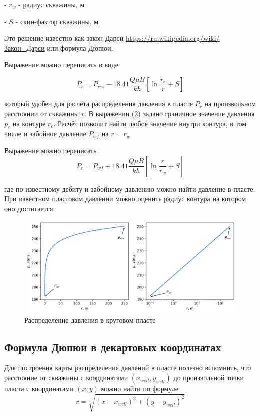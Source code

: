 \documentclass[oneside, openany]{memoir}
\begin{document}
	- $r_w$ - радиус скважины, м
	
	- $S$ - скин-фактор скважины, м
	
	Это решение известно как закон Дарси \url{https://ru.wikipedia.org/wiki/Закон_Дарси} или формула Дюпюи.
	
	Выражение можно переписать в виде
	
	\begin{equation}
		P_{r} = P_{res} - 18.41\dfrac{ Q\mu B }{kh} \left[ \ln\dfrac{r_e}{r} +S \right]
	\end{equation}
	
	который удобен для расчёта распределения давления в пласте $P_r$ на произвольном расстоянии от скважины $r$.
	В выражении (2) задано граничное значение давления $p_e$ на контуре $r_e$. Расчёт позволит найти любое значение внутри контура, в том числе и забойное давление $P_{wf}$ на $r=r_w$
	
	Выражение можно переписать 
	\begin{equation}
	P_{r} = P_{wf} + 18.41\dfrac{ Q\mu B }{kh} \left[ \ln\dfrac{r}{r_w} +S \right]
	\end{equation}
	
	где по известному дебиту и забойному давлению можно найти давление в пласте. При известном пластовом давлении можно оценить радиус контура на котором оно достигается.
	
	\begin{figure}[h!]
		\begin{center}
			\includegraphics[width=12cm]{pics/stac_pressure_dist_1.png}
			\caption{Распределение давления в круговом пласте}
			\label{ris:stac_pressure_dist_1}
		\end{center}
	\end{figure}
	
	\subsection{Формула Дюпюи в декартовых координатах}
	Для построения карты распределения давлений в пласте полезно вспомнить, что расстояние от скважины с координатами $(x_{well}, y_{well})$ до произвольной точки пласта с координатами $(x,y)$ можно найти по формуле 
	$$r=\sqrt{ (x-x_{well})^2 + (y-y_{well})^2 }$$
	
\end{document}
